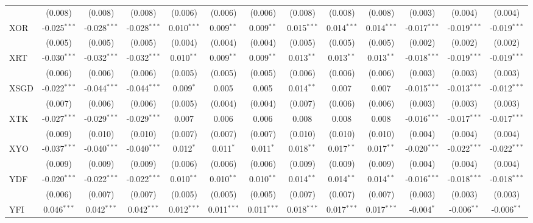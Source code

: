 \begin{table}[!htbp]
\begin{tabular}{@{\extracolsep{5pt}}lcccccccccccc}
  & (0.008) & (0.008) & (0.008) & (0.006) & (0.006) & (0.006) & (0.008) & (0.008) & (0.008) & (0.003) & (0.004) & (0.004) \\
 XOR & -0.025$^{***}$ & -0.028$^{***}$ & -0.028$^{***}$ & 0.010$^{***}$ & 0.009$^{**}$ & 0.009$^{**}$ & 0.015$^{***}$ & 0.014$^{***}$ & 0.014$^{***}$ & -0.017$^{***}$ & -0.019$^{***}$ & -0.019$^{***}$ \\
  & (0.005) & (0.005) & (0.005) & (0.004) & (0.004) & (0.004) & (0.005) & (0.005) & (0.005) & (0.002) & (0.002) & (0.002) \\
 XRT & -0.030$^{***}$ & -0.032$^{***}$ & -0.032$^{***}$ & 0.010$^{**}$ & 0.009$^{**}$ & 0.009$^{**}$ & 0.013$^{**}$ & 0.013$^{**}$ & 0.013$^{**}$ & -0.018$^{***}$ & -0.019$^{***}$ & -0.019$^{***}$ \\
  & (0.006) & (0.006) & (0.006) & (0.005) & (0.005) & (0.005) & (0.006) & (0.006) & (0.006) & (0.003) & (0.003) & (0.003) \\
 XSGD & -0.022$^{***}$ & -0.044$^{***}$ & -0.044$^{***}$ & 0.009$^{*}$ & 0.005$^{}$ & 0.005$^{}$ & 0.014$^{**}$ & 0.007$^{}$ & 0.007$^{}$ & -0.015$^{***}$ & -0.013$^{***}$ & -0.012$^{***}$ \\
  & (0.007) & (0.006) & (0.006) & (0.005) & (0.004) & (0.004) & (0.007) & (0.006) & (0.006) & (0.003) & (0.003) & (0.003) \\
 XTK & -0.027$^{***}$ & -0.029$^{***}$ & -0.029$^{***}$ & 0.007$^{}$ & 0.006$^{}$ & 0.006$^{}$ & 0.008$^{}$ & 0.008$^{}$ & 0.008$^{}$ & -0.016$^{***}$ & -0.017$^{***}$ & -0.017$^{***}$ \\
  & (0.009) & (0.010) & (0.010) & (0.007) & (0.007) & (0.007) & (0.010) & (0.010) & (0.010) & (0.004) & (0.004) & (0.004) \\
 XYO & -0.037$^{***}$ & -0.040$^{***}$ & -0.040$^{***}$ & 0.012$^{*}$ & 0.011$^{*}$ & 0.011$^{*}$ & 0.018$^{**}$ & 0.017$^{**}$ & 0.017$^{**}$ & -0.020$^{***}$ & -0.022$^{***}$ & -0.022$^{***}$ \\
  & (0.009) & (0.009) & (0.009) & (0.006) & (0.006) & (0.006) & (0.009) & (0.009) & (0.009) & (0.004) & (0.004) & (0.004) \\
 YDF & -0.020$^{***}$ & -0.022$^{***}$ & -0.022$^{***}$ & 0.010$^{**}$ & 0.010$^{**}$ & 0.010$^{**}$ & 0.014$^{**}$ & 0.014$^{**}$ & 0.014$^{**}$ & -0.016$^{***}$ & -0.018$^{***}$ & -0.018$^{***}$ \\
  & (0.006) & (0.007) & (0.007) & (0.005) & (0.005) & (0.005) & (0.007) & (0.007) & (0.007) & (0.003) & (0.003) & (0.003) \\
 YFI & 0.046$^{***}$ & 0.042$^{***}$ & 0.042$^{***}$ & 0.012$^{***}$ & 0.011$^{***}$ & 0.011$^{***}$ & 0.018$^{***}$ & 0.017$^{***}$ & 0.017$^{***}$ & -0.004$^{*}$ & -0.006$^{**}$ & -0.006$^{**}$ \\

\end{tabular}
\end{table}

